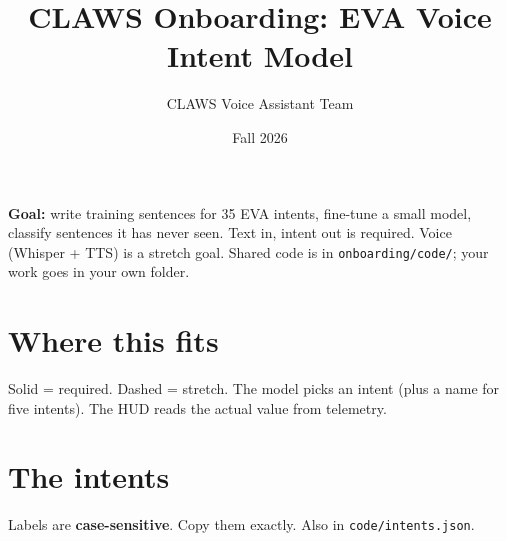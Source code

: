 \documentclass[11pt]{article}
\title{\textbf{CLAWS Onboarding: EVA Voice Intent Model}}
\author{CLAWS Voice Assistant Team}
\date{Fall 2026}
\begin{document}
\maketitle

\textbf{Goal:} write training sentences for 35 EVA intents, fine-tune a small
model, classify sentences it has never seen. Text in, intent out is required.
Voice (Whisper + TTS) is a stretch goal. Shared code is in
\texttt{onboarding/code/}; your work goes in your own folder.

\section{Where this fits}

\begin{center}
\end{center}

Solid = required. Dashed = stretch. The model picks an intent (plus a name for
five intents). The HUD reads the actual value from telemetry.

\newpage
\section{The intents}

Labels are \textbf{case-sensitive}. Copy them exactly. Also in
\texttt{code/intents.json}.
\end{document}
